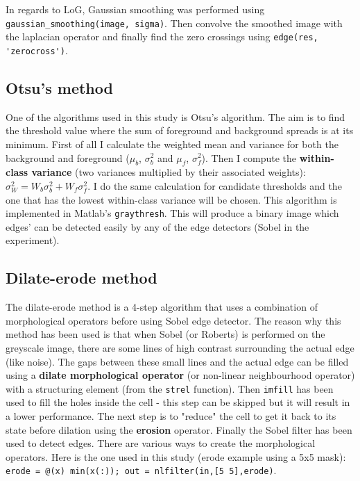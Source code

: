 \documentclass{article}
\begin{document}
	In regards to LoG, Gaussian smoothing was performed using \verb|gaussian_smoothing(image, sigma)|. Then convolve the smoothed image with the laplacian
	operator and finally find the zero crossings using \verb|edge(res, 'zerocross')|.
	
	\subsection*{Otsu's method}
	One of the algorithms used in this study is Otsu's algorithm.
	The aim is to find the threshold value where the sum of foreground and background spreads is at its minimum. First of all I calculate the weighted mean and variance
	for both the background and foreground ($\mu_b$, $\sigma_b^2$ and
	$\mu_f$, $\sigma_f^2$). Then I compute the \textbf{within-class variance} (two variances multiplied by their associated weights): $\sigma_W^2 = W_b \sigma_b^2+W_f \sigma_f^2$. I do the same calculation for candidate thresholds and the one that has the lowest within-class variance will be chosen. This algorithm is implemented in Matlab's
	\verb|graythresh|. This will produce a binary image which edges' can be detected
	easily by any of the edge detectors (Sobel in the experiment).
	
	\subsection*{Dilate-erode method}	
	
	The dilate-erode method is a 4-step algorithm that uses a combination of  morphological operators before using Sobel edge detector. The reason why this method
	has been used is that when Sobel (or Roberts) is performed on the greyscale image, there are some lines of high contrast surrounding
	the actual edge (like noise). The gaps between these small lines and the actual edge
	can be filled using a \textbf{dilate morphological operator} (or non-linear neighbourhood
	operator) with a structuring element (from the \verb|strel| function). Then
	\verb|imfill| has been used to fill the holes inside the cell - this step can
	be skipped but it will result in a lower performance.
	The next step is to "reduce" the cell to get it back to its state before
	dilation using
	the \textbf{erosion} operator. Finally the Sobel filter has been used to detect
	edges.
	There are various ways to create the  morphological operators. Here is the one
	used in this study (erode example using a 5x5 mask): \verb|erode = @(x) min(x(:)); out = nlfilter(in,[5 5],erode)|.
	
\end{document}
